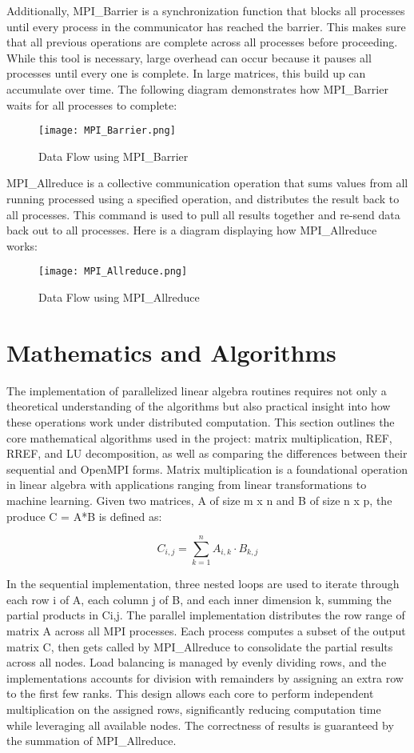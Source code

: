 \documentclass[12pt]{article}
\begin{document}
Additionally, MPI\_Barrier is a synchronization function that blocks all processes until every process in the communicator has reached the barrier. This makes sure that all previous operations are complete across all processes before proceeding. While this tool is necessary, large overhead can occur because it pauses all processes until every one is complete. In large matrices, this build up can accumulate over time. The following diagram demonstrates how MPI\_Barrier waits for all processes to complete:

\begin{figure}[H]
    \centering
    \texttt{[image: MPI\_Barrier.png]}
    \caption{Data Flow using MPI\_Barrier}
    \label{fig:mpi_barrier}
\end{figure}

MPI\_Allreduce is a collective communication operation that sums values from all running processed using a specified operation, and distributes the result back to all processes. This command is used to pull all results together and re-send data back out to all processes. Here is a diagram displaying how MPI\_Allreduce works: 

\begin{figure}[H]
    \centering
    \texttt{[image: MPI\_Allreduce.png]}
    \caption{Data Flow using MPI\_Allreduce}
    \label{fig:mpi_allreduce}
\end{figure}

\section{Mathematics and Algorithms}
The implementation of parallelized linear algebra routines requires not only a theoretical understanding of the algorithms but also practical insight into how these operations work under distributed computation. This section outlines the core mathematical algorithms used in the project: matrix multiplication, REF, RREF, and LU decomposition, as well as comparing the differences between their sequential and OpenMPI forms.
Matrix multiplication is a foundational operation in linear algebra with applications ranging from linear transformations to machine learning. Given two matrices, A of size m x n and B of size n x p, the produce C = A*B is defined as:

\[
    C_{i,j} = \sum_{k=1}^{n} A_{i,k} \cdot B_{k,j}
\]

In the sequential implementation, three nested loops are used to iterate through each row i of A, each column j of B, and each inner dimension k, summing the partial products in Ci,j. The parallel implementation distributes the row range of matrix A across all MPI processes. Each process computes a subset of the output matrix C, then gets called by MPI\_Allreduce to consolidate the partial results across all nodes. Load balancing is managed by evenly dividing rows, and the implementations accounts for division with remainders by assigning an extra row to the first few ranks. This design allows each core to perform independent multiplication on the assigned rows, significantly reducing computation time while leveraging all available nodes. The correctness of results is guaranteed by the summation of MPI\_Allreduce.
\end{document}
